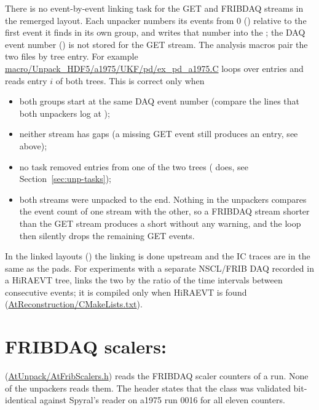 There is no event-by-event linking task for the GET and FRIBDAQ streams in the remerged layout.
Each unpacker numbers its events from 0 () relative to the first event it finds in
its own group, and writes that number into the ; the DAQ event number
() is not stored for the GET stream. The analysis macros pair the two files by
tree entry. For example \url{macro/Unpack_HDF5/a1975/UKF/pd/ex_pd_a1975.C} loops over
 entries and reads entry $i$ of both trees. This
is correct only when
\begin{itemize}
  \item both groups start at the same DAQ event number (compare the  lines
        that both unpackers log at );
  \item neither stream has gaps (a missing GET event still produces an entry, see above);
  \item no task removed entries from one of the two trees ( does, see
        Section~\ref{sec:unp-tasks});
  \item both streams were unpacked to the end. Nothing in the unpackers compares the event count
        of one stream with the other, so a FRIBDAQ stream shorter than the GET stream produces a
        short  without any warning, and the  loop then silently
        drops the remaining GET events.
\end{itemize}
In the linked layouts () the linking is done upstream and the IC
traces are in the same  as the pads. For experiments with a separate NSCL/FRIB DAQ
recorded in a HiRAEVT tree,  links the two by the ratio of the time intervals
between consecutive events; it is compiled only when HiRAEVT is found
(\url{AtReconstruction/CMakeLists.txt}).

\section{FRIBDAQ scalers: }
\label{sec:unp-scalers}

 (\url{AtUnpack/AtFribScalers.h}) reads the FRIBDAQ scaler counters of a run.
None of the unpackers reads them. The header states that the class was validated bit-identical
against Spyral's reader on a1975 run 0016 for all eleven counters.

